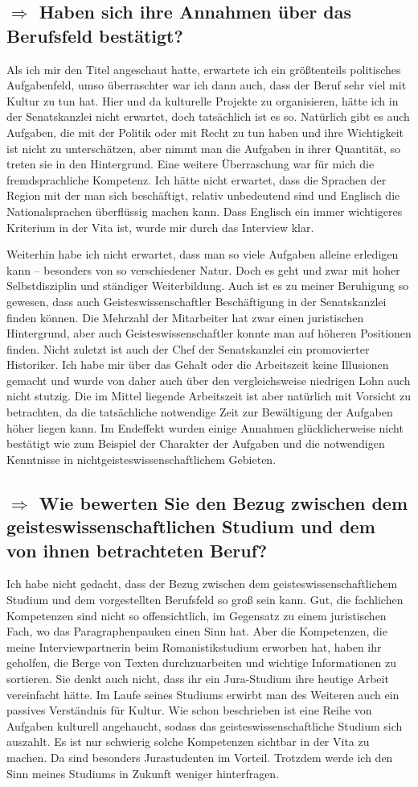 \documentclass[12pt,headsepline,a4paper]{scrartcl}
\newcommand\quest[1]{\subsection*{$\Rightarrow$ #1}}
\begin{document}
\quest{Haben sich ihre Annahmen über das Berufsfeld bestätigt?}
Als ich mir den Titel angeschaut hatte, erwartete ich ein größtenteils politisches Aufgabenfeld, umso überraschter war ich dann auch, dass der Beruf sehr viel mit Kultur zu tun hat. Hier und da kulturelle Projekte zu organisieren, hätte ich in der Senatskanzlei nicht erwartet, doch tatsächlich ist es so. Natürlich gibt es auch Aufgaben, die mit der Politik oder mit Recht zu tun haben und ihre Wichtigkeit ist nicht zu  unterschätzen, aber nimmt man die Aufgaben in ihrer Quantität, so treten sie in den Hintergrund.
Eine weitere Überraschung war für mich die fremdsprachliche Kompetenz. Ich hätte nicht erwartet, dass die Sprachen der Region mit der man sich beschäftigt, relativ unbedeutend sind und Englisch die Nationalsprachen überflüssig machen kann. Dass Englisch ein immer wichtigeres Kriterium in der Vita ist, wurde mir durch das Interview klar.

Weiterhin habe ich nicht erwartet, dass man so viele Aufgaben alleine erledigen kann -- besonders von so verschiedener Natur. Doch es geht und zwar mit hoher Selbstdisziplin und ständiger Weiterbildung. 
Auch ist es zu meiner Beruhigung so gewesen, dass auch Geisteswissenschaftler Beschäftigung in der Senatskanzlei finden können. Die Mehrzahl der Mitarbeiter hat zwar einen juristischen Hintergrund, aber auch Geisteswissenschaftler konnte man auf höheren Positionen finden. Nicht zuletzt ist auch der Chef der Senatskanzlei ein promovierter Historiker.
Ich habe mir über das Gehalt oder die Arbeitszeit keine Illusionen gemacht und wurde von daher auch über den vergleichsweise niedrigen Lohn auch  nicht stutzig. Die im Mittel liegende Arbeitszeit ist aber natürlich mit Vorsicht zu betrachten, da die tatsächliche notwendige Zeit zur Bewältigung der Aufgaben höher liegen kann.
Im Endeffekt wurden einige Annahmen glücklicherweise nicht bestätigt wie zum Beispiel der Charakter der Aufgaben und die notwendigen Kenntnisse in nichtgeisteswissenschaftlichem Gebieten.

\quest{Wie bewerten Sie den Bezug zwischen dem geisteswissenschaftlichen Studium und dem von ihnen betrachteten Beruf?}
Ich habe nicht gedacht, dass der Bezug zwischen dem geisteswissenschaftlichem Studium und dem vorgestellten Berufsfeld so groß sein kann. Gut, die fachlichen Kompetenzen sind nicht so offensichtlich, im Gegensatz zu einem juristischen Fach, wo das Paragraphenpauken einen Sinn hat. Aber die  Kompetenzen, die meine Interviewpartnerin beim Romanistikstudium erworben hat, haben ihr geholfen, die Berge von Texten durchzuarbeiten und wichtige Informationen zu sortieren. Sie denkt auch nicht, dass ihr ein Jura-Studium ihre heutige Arbeit vereinfacht hätte.
Im Laufe seines Studiums erwirbt man des Weiteren auch ein passives Verständnis für Kultur. Wie schon beschrieben ist eine Reihe von Aufgaben kulturell angehaucht, sodass das geisteswissenschaftliche Studium sich auszahlt.
Es ist nur schwierig solche Kompetenzen sichtbar in der Vita zu machen. Da sind besonders Jurastudenten im Vorteil. Trotzdem werde ich den Sinn meines Studiums in Zukunft weniger hinterfragen.
\end{document}
